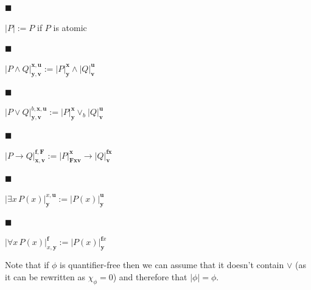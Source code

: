 \documentclass[10pt,a4paper]{article}
\begin{document}
 
  
\par\noindent  $\blacksquare$ 
 
$|{P}|:=P$ if $P$ is atomic\par
 
 
 
\par\noindent  $\blacksquare$ 
 
$|{P\wedge Q}|^{\bm{x},\bm{u}}_{\bm{y},\bm{v}}:=|{P}|^{\bm{x}}_{\bm{y}}\wedge|{Q}|^{\bm{u}}_{\bm{v}}$\par
 
 
 
\par\noindent  $\blacksquare$ 
 
$|{P\vee Q}|^{b,\bm{x},\bm{u}}_{\bm{y},\bm{v}}:=|{P}|^{\bm{x}}_{\bm{y}}\vee_{b}|{Q}|^{\bm{u}}_{\bm{v}}$\par
 
 
 
\par\noindent  $\blacksquare$ 
 
$|{P\to Q}|^{\bm{f},\bm{F}}_{\bm{x},\bm{v}}:=|{P}|^{\bm{x}}_{\bm{F}\bm{x}\bm{v}}\to|{Q}|^{\bm{f}\bm{x}}_{\bm{v}}$\par
 
 
 
\par\noindent  $\blacksquare$ 
 
$|{\exists x\,P(x)}|^{x,\bm{u}}_{\bm{y}}:=|{P(x)}|^{\bm{u}}_{\bm{y}}$\par
 
 
 
\par\noindent  $\blacksquare$ 
 
$|{\forall x\,P(x)}|^{\bm{f}}_{x,\bm{y}}:=|{P(x)}|^{\bm{f}x}_{\bm{y}}$\par
 
 
  
 
 
Note that if $\phi$ is quantifier-free then we can assume that it doesn’t contain $\vee$ (as it can be rewritten as $\chi_{\phi}=0$) and therefore that $|{\phi}|=\phi$.\par
 
\end{document}
